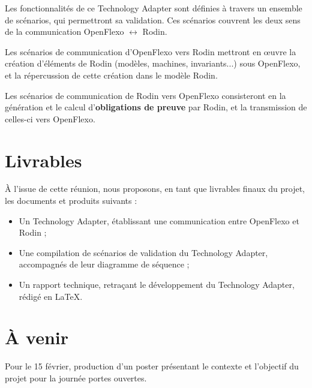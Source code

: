 \documentclass{article}
\begin{document}
Les fonctionnalités de ce Technology Adapter sont définies à travers un ensemble de scénarios, qui permettront sa validation.
Ces scénarios couvrent les deux sens de la communication OpenFlexo \(\leftrightarrow\) Rodin.

Les scénarios de communication d'OpenFlexo vers Rodin mettront en œuvre la création d'éléments de Rodin (modèles, machines, invariants...) sous OpenFlexo, et la répercussion %
de cette création dans le modèle Rodin.

Les scénarios de communication de Rodin vers OpenFlexo consisteront en la génération et le calcul d'\textbf{obligations de preuve} par Rodin, et la transmission de celles-ci vers OpenFlexo.


\section*{Livrables}
À l'issue de cette réunion, nous proposons, en tant que livrables finaux du projet, les documents et produits suivants :

\begin{itemize}
    \item Un Technology Adapter, établissant une communication entre OpenFlexo et Rodin ;
    \item Une compilation de scénarios de validation du Technology Adapter, accompagnés de leur diagramme de séquence ;
    \item Un rapport technique, retraçant le développement du Technology Adapter, rédigé en \LaTeX.
\end{itemize}


\section*{À venir}
Pour le 15 février, production d'un poster présentant le contexte et l'objectif du projet pour la journée portes ouvertes.
\end{document}
